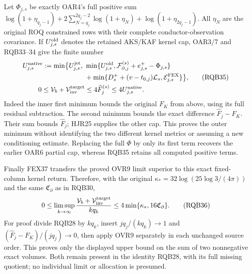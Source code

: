 \documentclass[11pt,a4paper]{article}
\begin{document}
Let $\Phi_{j,s}$ be exactly OAR4's full positive sum
$\log(1+\eta_{q_j-1})+
2\sum_{N=q_j}^{2q_j-2}\log(1+\eta_N)+\log(1+\eta_{2q_j-1})$.
All $\eta_N$ are the original ROQ constrained rows with their complete
conductor-observation covariance. If $U_{j,s}^{\rm old}$ denotes the
retained AKS/KAF kernel cap, OAR3/7 and RQB33--34 give the finite number
\[
\begin{split}
 U_{j,s}^{\rm native}
   :=\min\bigl\{U_{j,s}^{\rm jet},\
       &\min\{U_{j,s}^{\rm old},
              \mathcal F_{\partial,j}^{(s)}+e_{j,s}^+-\Phi_{j,s}\}\\
       &+\min\{D_s^++(v-t_{0,j})\mathcal L_s,
                                     \mathcal E_{j,s}^{\rm FEX}\}\bigr\},\\
 0\le\mathcal V_b+\mathcal V_{\rm inv}^{\rm target}
             &\le4\widehat F_j^{(s)}
                       \le4U_{j,s}^{\rm native}.
\end{split}\tag{RQB35}
\]
Indeed the inner first minimum bounds the original $F_K$ from above,
using its full residual subtraction. The second minimum bounds the
exact difference $\widehat F_j-F_K$. Their sum bounds $\widehat F_j$;
HJR25 supplies the other cap. This proves the outer minimum without
identifying the two different kernel metrics or assuming a new
conditioning estimate. Replacing the full $\Phi$ by only its first
term recovers the earlier OAR6 partial cap, whereas RQB35 retains
all computed positive terms.

Finally FEX37 transfers the proved OVR9 limit superior to this exact
fixed-column kernel return. Therefore, with the original
$\kappa_*=32\log(25\log3/(4\pi))$ and the same
$\mathfrak C_\partial$ as in RQB30,
\[
 0\le\limsup_{k\to\infty}
       \frac{\mathcal V_b+\mathcal V_{\rm inv}^{\rm target}}{kq_k}
       \le4\min\{\kappa_*,16\mathfrak C_\partial\}.
 \tag{RQB36}
\]
For proof divide RQB28 by $kq_k$, insert
$j q_j/(kq_k)\to1$ and
$(\widehat F_j-F_K)/(j q_j)\to0$, then apply OVR9 separately
in each unchanged source order. This proves only the displayed
upper bound on the sum of two nonnegative exact volumes.
Both remain present in the identity RQB28, with its full
missing quotient; no individual limit or allocation is presumed.



\end{document}
